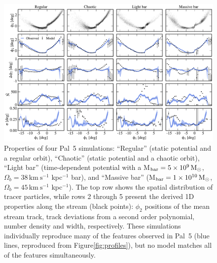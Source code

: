 \documentclass[twocolumn]{aastex62}
\newcommand{\msun}{\textrm{M}_\odot}
\newcommand{\kms}{\ensuremath{\textrm{km}~\textrm{s}^{-1}}}
\begin{document}
\begin{figure}
\begin{center}
\includegraphics[width=\textwidth]{model_comparison.pdf}
\end{center}
\caption{
Properties of four Pal~5 simulations: ``Regular'' (static potential and a regular orbit), ``Chaotic'' (static potential and a chaotic orbit), ``Light bar'' (time-dependent potential with a M$_{\rm bar} = 5\times 10^{9}\,\msun$, $\Omega_b = 38\,\kms$ kpc$^{-1}$ bar), and ``Massive bar'' (M$_{\rm bar} = 1\times 10^{10}\,\msun$, $\Omega_b = 45\,\kms$ kpc$^{-1}$).
The top row shows the spatial distribution of tracer particles, while rows 2 through 5 present the derived 1D properties along the stream (black points): $\phi_2$ positions of the mean stream track, track deviations from a second order polynomial, number density and width, respectively.
These simulations individually reproduce many of the features observed in Pal~5 (blue lines, reproduced from Figure\ref{fig:profiles}), but no model matches all of the features simultaneously.
}
\end{figure}
\end{document}
